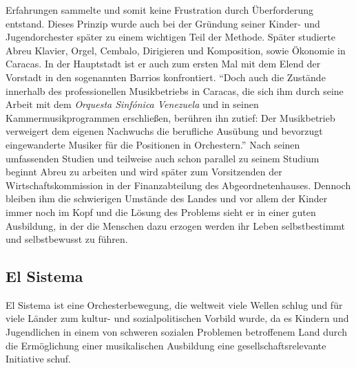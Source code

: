 Erfahrungen sammelte und somit keine Frustration durch Überforderung entstand.
Dieses Prinzip wurde auch bei der Gründung seiner Kinder- und Jugendorchester
später zu einem wichtigen Teil der Methode. Später studierte Abreu Klavier,
Orgel, Cembalo, Dirigieren und Komposition, sowie Ökonomie in Caracas. In der
Hauptstadt ist er auch zum ersten Mal mit dem Elend der Vorstadt in den
sogenannten Barrios konfrontiert. \enquote{Doch auch die Zustände innerhalb des
professionellen Musikbetriebs in Caracas, die sich ihm durch seine Arbeit mit
dem \emph{Orquesta Sinfónica Venezuela} und in seinen Kammermusikprogrammen
erschließen, berühren ihn zutief: Der Musikbetrieb verweigert dem eigenen
Nachwuchs die berufliche Ausübung und bevorzugt eingewanderte Musiker für die
Positionen in Orchestern.}\autocite[28]{kaufmann:el_sistema} Nach seinen
umfassenden Studien und teilweise auch schon parallel zu seinem Studium beginnt
Abreu zu arbeiten und wird später zum Vorsitzenden der Wirtschaftskommission in
der Finanzabteilung des Abgeordnetenhauses. Dennoch bleiben ihm die schwierigen
Umstände des Landes und vor allem der Kinder immer noch im Kopf und die Lösung
des Problems sieht er in einer guten Ausbildung, in der die Menschen dazu
erzogen werden ihr Leben selbstbestimmt und selbstbewusst zu
führen.\autocite[31]{kaufmann:el_sistema} 



\subsection{El Sistema}

El Sistema ist eine Orchesterbewegung, die weltweit viele Wellen schlug und für
viele Länder zum kultur- und sozialpolitischen Vorbild wurde, da es Kindern und
Jugendlichen in einem von schweren sozialen Problemen betroffenem Land durch die
Ermöglichung einer musikalischen Ausbildung eine gesellschaftsrelevante
Initiative schuf. 

